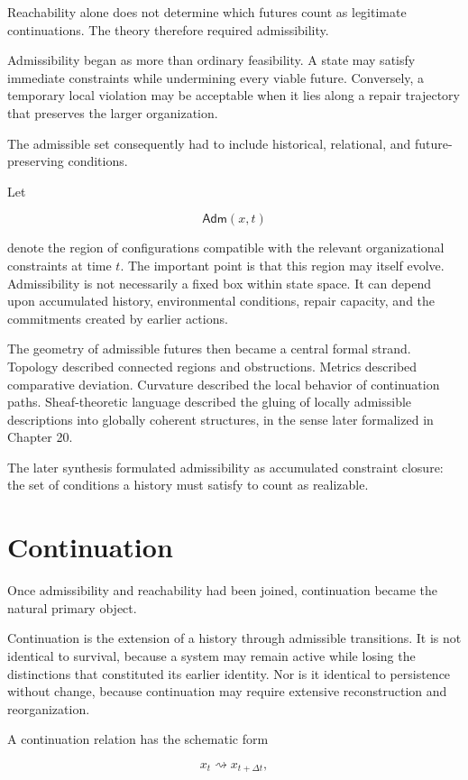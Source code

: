 \documentclass[11pt,oneside]{book}
\numberwithin{equation}{chapter}
\theoremstyle{definition}
\theoremstyle{plain}
\newcommand{\Adm}{\mathsf{Adm}}
\begin{document}
Reachability alone does not determine which futures count as legitimate
continuations. The theory therefore required admissibility.

Admissibility began as more than ordinary feasibility. A state may satisfy
immediate constraints while undermining every viable future. Conversely, a
temporary local violation may be acceptable when it lies along a repair
trajectory that preserves the larger organization.

The admissible set consequently had to include historical, relational, and
future-preserving conditions.

Let

\[
\Adm(x,t)
\]

denote the region of configurations compatible with the relevant
organizational constraints at time \(t\). The important point is that this
region may itself evolve. Admissibility is not necessarily a fixed box
within state space. It can depend upon accumulated history, environmental
conditions, repair capacity, and the commitments created by earlier
actions.

The geometry of admissible futures then became a central formal strand.
Topology described connected regions and obstructions. Metrics described
comparative deviation. Curvature described the local behavior of
continuation paths. Sheaf-theoretic language described the gluing of
locally admissible descriptions into globally coherent structures, in the
sense later formalized in Chapter 20.

The later synthesis formulated admissibility as accumulated constraint
closure: the set of conditions a history must satisfy to count as
realizable.

\section{Continuation}

Once admissibility and reachability had been joined, continuation became the
natural primary object.

Continuation is the extension of a history through admissible transitions.
It is not identical to survival, because a system may remain active while
losing the distinctions that constituted its earlier identity. Nor is it
identical to persistence without change, because continuation may require
extensive reconstruction and reorganization.

A continuation relation has the schematic form

\[
x_t
\rightsquigarrow
x_{t+\Delta t},
\]
\end{document}
